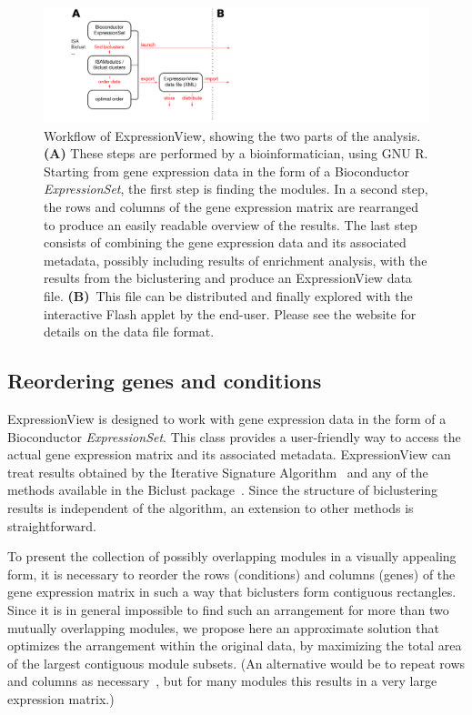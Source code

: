 \documentclass[round]{bioinfo}
\begin{document}
\begin{figure}
\centering
\includegraphics[width=0.7\linewidth]{fig1}
\caption{
  Workflow of ExpressionView, showing the two parts of the analysis.
  \textbf{(A)} These steps are performed by a bioinformatician,
  using GNU R. Starting from gene expression data in the form of a
  Bioconductor \textit{ExpressionSet}, the first step is finding the
  modules. In a second step, the rows and columns of the gene
  expression matrix are rearranged to produce an easily readable
  overview of the results. The last step consists of combining the
  gene expression data and its associated metadata, possibly including
  results of enrichment analysis, with the results
  from the biclustering and produce an ExpressionView data file.
  \textbf{(B)}~This file can be distributed and finally explored with
  the interactive Flash applet by the end-user. Please see the
  website for details on the data file format.}
\label{fig:workflow}
\end{figure}

\vspace*{-9pt}
\subsection{Reordering genes and conditions}

ExpressionView is designed to work with gene expression data in the
form of a Bioconductor \textit{ExpressionSet}. This class provides a
user-friendly way to access the actual gene expression matrix and its
associated metadata. ExpressionView can treat results obtained by the 
Iterative Signature Algorithm~\citep{bergmann03,csardi10} and any of 
the methods available in the Biclust package~\citep{kaiser08}. Since 
the structure of biclustering results is independent of the algorithm, 
an extension to other methods is straightforward.

To present the collection of possibly overlapping modules in a visually
appealing form, it is necessary to reorder the rows (conditions) and
columns (genes) of the gene expression matrix in such a way that
biclusters form contiguous
rectangles. Since it is in general impossible to find such an
arrangement for more than two mutually overlapping modules, we propose
here an approximate solution that optimizes the arrangement within the
original data, by maximizing the total area of the largest contiguous
module subsets. (An alternative would be to repeat rows and columns as
necessary~\citep{grothaus06}, but for many modules this results in
a very large expression matrix.)
\end{document}
